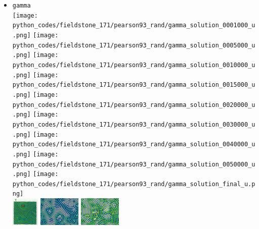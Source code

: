 \begin{itemize}
\item {\tt gamma}\\
\texttt{[image: python\_codes/fieldstone\_171/pearson93\_rand/gamma\_solution\_0001000\_u.png]}
\texttt{[image: python\_codes/fieldstone\_171/pearson93\_rand/gamma\_solution\_0005000\_u.png]}
\texttt{[image: python\_codes/fieldstone\_171/pearson93\_rand/gamma\_solution\_0010000\_u.png]}
\texttt{[image: python\_codes/fieldstone\_171/pearson93\_rand/gamma\_solution\_0015000\_u.png]}
\texttt{[image: python\_codes/fieldstone\_171/pearson93\_rand/gamma\_solution\_0020000\_u.png]}
\texttt{[image: python\_codes/fieldstone\_171/pearson93\_rand/gamma\_solution\_0030000\_u.png]}
\texttt{[image: python\_codes/fieldstone\_171/pearson93\_rand/gamma\_solution\_0040000\_u.png]}
\texttt{[image: python\_codes/fieldstone\_171/pearson93\_rand/gamma\_solution\_0050000\_u.png]}
\texttt{[image: python\_codes/fieldstone\_171/pearson93\_rand/gamma\_solution\_final\_u.png]} \\
\includegraphics[height=1.4cm]{python_codes/fieldstone_171/images/pear93_gamma}
\includegraphics[height=1.4cm]{python_codes/fieldstone_171/images/munafo_gamma1}
\includegraphics[height=1.4cm]{python_codes/fieldstone_171/images/munafo_gamma2}


\end{itemize}
